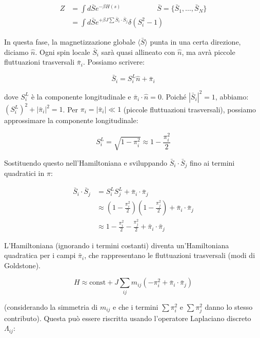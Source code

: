 \begin{align*}
Z &= \int d\bar{S} e^{-\beta H(s)} \quad \quad \quad \quad \quad \bar{S} = \{\bar{S}_1, \dots, \bar{S}_N\} \\ 
&= \int d\bar{S} e^{+\beta J \sum \bar{S}_i \cdot \bar{S}_j} \delta(S_i^2 - 1)
\end{align*}

In questa fase, la magnetizzazione globale $\langle \bar{S} \rangle$ punta in una certa direzione, diciamo $\hat{n}$. Ogni spin locale $\bar{S}_i$ sarà quasi allineato con $\hat{n}$, ma avrà piccole fluttuazioni trasversali $\bar{\pi}_i$. Possiamo scrivere:

\begin{equation} \label{eq:ch19_31}
\bar{S}_i = S_i^L \hat{n} + \bar{\pi}_i
\end{equation}

dove $S_i^L$ è la componente longitudinale e $\bar{\pi}_i \cdot \hat{n} = 0$. Poiché $|\bar{S}_i|^2 = 1$, abbiamo:
$(S_i^L)^2 + |\bar{\pi}_i|^2 = 1$.
Per $\pi_i = |\bar{\pi}_i| \ll 1$ (piccole fluttuazioni trasversali), possiamo approssimare la componente longitudinale:

\begin{equation} \label{eq:ch19_32}
S_i^L = \sqrt{1 - \pi_i^2} \approx 1 - \frac{\pi_i^2}{2}
\end{equation}

Sostituendo questo nell'Hamiltoniana e sviluppando $\bar{S}_i \cdot \bar{S}_j$ fino ai termini quadratici in $\pi$:

\begin{align*} 
\bar{S}_i \cdot \bar{S}_j &= S_i^L S_j^L + \bar{\pi}_i \cdot \bar{\pi}_j \\ 
&\approx \left(1-\frac{\pi_i^2}{2}\right)\left(1-\frac{\pi_j^2}{2}\right) + \bar{\pi}_i \cdot \bar{\pi}_j \\ 
&\approx 1 - \frac{\pi_i^2}{2} - \frac{\pi_j^2}{2} + \bar{\pi}_i \cdot \bar{\pi}_j 
\end{align*}

L'Hamiltoniana (ignorando i termini costanti) diventa un'Hamiltoniana quadratica per i campi $\bar{\pi}_i$, che rappresentano le fluttuazioni trasversali (modi di Goldstone).

\begin{equation} \label{eq:ch19_33}
H \approx \text{const} + J \sum_{ij} m_{ij} \left( -\pi_i^2 + \bar{\pi}_i \cdot \bar{\pi}_j \right)
\end{equation}

(considerando la simmetria di $m_{ij}$ e che i termini $\sum \pi_i^2$ e $\sum \pi_j^2$ danno lo stesso contributo).
Questa può essere riscritta usando l'operatore Laplaciano discreto $\Lambda_{ij}$:

